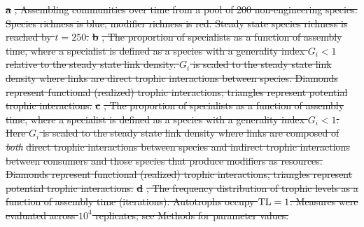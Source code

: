 \documentclass[twocolumn,preprintnumbers,amsmath,amssymb,superscriptaddress,linenumbers]{revtex4-1}
\providecommand{\DIFdel}[1]{{\protect\color{red}\sout{#1}}}                      %
\providecommand{\DIFdelFL}[1]{\DIFdel{#1}} %
\begin{document}
{%
\textbf{\DIFdelFL{a}}%
\DIFdelFL{, Assembling communities over time from a pool of 200 non-engineering species. Species richness is blue; modifier richness is red.
Steady state species richness is reached by $t=250$.
}\textbf{\DIFdelFL{b}}%
\DIFdelFL{, The proportion of specialists as a function of assembly time, where a specialist is defined as a species with a generality index $G_i < 1$ relative to the steady state link density.
$G_i$ is scaled to the steady state link density where links are direct trophic interactions between species.
Diamonds represent functional (realized) trophic interactions; triangles represent potential trophic interactions.
}\textbf{\DIFdelFL{c}}%
\DIFdelFL{, The proportion of specialists as a function of assembly time, where a specialist is defined as a species with a generality index $G_i < 1$.
Here $G_i$ is scaled to the steady state link density where links are composed of }\emph{\DIFdelFL{both}} %
\DIFdelFL{direct trophic interactions between species and indirect trophic interactions between consumers and those species that produce modifiers as resources.
Diamonds represent functional (realized) trophic interactions; triangles represent potential trophic interactions.
}\textbf{\DIFdelFL{d}}%
\DIFdelFL{, The frequency distribution of trophic levels as a function of assembly time (iterations). 
Autotrophs occupy ${\rm TL}=1$.
Measures were evaluated across $10^4$ replicates; see Methods for parameter values.
}}
\end{document}
